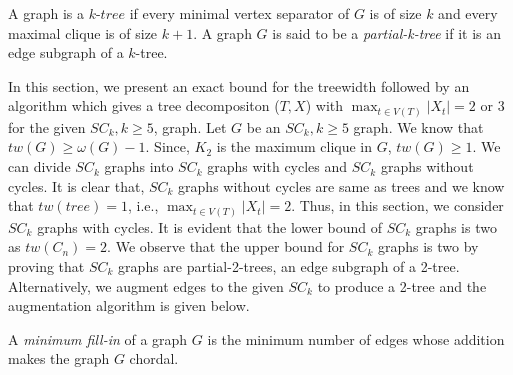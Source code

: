 \documentclass[runningheads]{llncs}
\begin{document}
\begin{definition}
A graph is a $k$-$tree$ if every minimal vertex separator of $G$ is of size $k$ and every maximal clique is of size $k+1$. A graph $G$ is said to be a \emph{partial-k-tree} if it is an edge subgraph of a $k$-tree.
\end{definition}

In this section, we present an exact bound for the treewidth followed by an algorithm which gives a tree decompositon ($T, X$) with $\max_{t \in V(T)} \vert X_t \vert = 2$ or $3$ for the given $SC_k, k \geq 5$, graph. Let $G$ be an $SC_k, k \geq 5$ graph. We know that $tw(G) \geq \omega (G) - 1$. Since, $K_2$ is the maximum clique in $G$, $tw(G) \geq 1$. We can divide $SC_k$ graphs into $SC_k$ graphs with cycles and $SC_k$ graphs without cycles. It is clear that, $SC_k$ graphs without cycles are same as trees and we know that $tw(tree) = 1$, i.e., $\max_{t \in V(T)} \vert X_t \vert = 2$. Thus, in this section, we consider $SC_k$ graphs with cycles. It is evident that the lower bound of $SC_k$ graphs is two as $tw(C_n)=2$. We observe that the upper bound for $SC_k$ graphs is two by proving that $SC_k$ graphs are partial-2-trees, an edge subgraph of a 2-tree. Alternatively, we augment edges to the given $SC_k$ to produce a 2-tree and the augmentation algorithm is given below.

\begin{definition}
A \emph{minimum fill-in} of a graph $G$ is the minimum number of edges whose addition makes the graph $G$ chordal.
\end{definition}

\begin{algorithm}
\caption{$\mathtt{Fill-in~~ of~~ SC_k ~~graph}$}
\begin{algorithmic}[1]
		\ENDIF
\ENDFOR
{}
\end{algorithmic}
\label{alg:partial2tree}
\end{algorithm}
\end{document}
